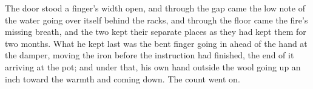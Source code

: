 The door stood a finger's width open, and through the gap came the low note of the water going over itself behind the racks, and through the floor came the fire's missing breath, and the two kept their separate places as they had kept them for two months. What he kept last was the bent finger going in ahead of the hand at the damper, moving the iron before the instruction had finished, the end of it arriving at the pot; and under that, his own hand outside the wool going up an inch toward the warmth and coming down. The count went on.
